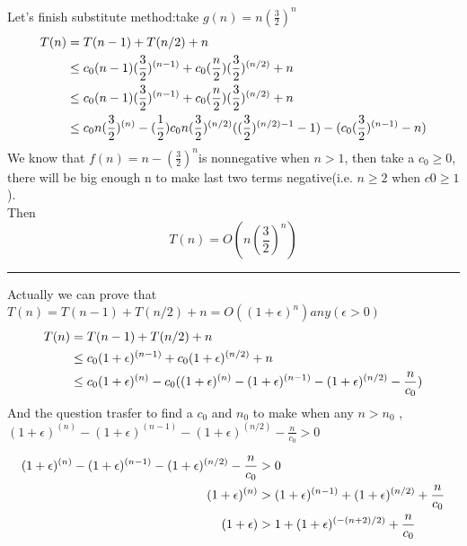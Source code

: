\documentclass[oneside]{homework} %
\begin{document}
Let's finish substitute method:take $g(n)=n {(\frac{3}{2})}^n$
\\
\begin{equation}
\notag
\begin{aligned}[b]
T(n) &= T(n-1) + T(n/2) + n \\
&\leq c_{0}(n-1)(\frac{3}{2})^{(n-1)} + c_{0}(\frac{n}{2})(\frac{3}{2})^{(n/2)} +n \\
&\leq c_{0}(n-1)(\frac{3}{2})^{(n-1)} + c_{0}(\frac{n}{2})(\frac{3}{2})^{(n/2)} +n \\
&\leq c_{0}n(\frac{3}{2})^{(n)} - (\frac{1}{2})c_{0}n(\frac{3}{2})^{(n/2)}((\frac{3}{2})^{(n/2)-1} -1 ) - (c_{0}(\frac{3}{2})^{(n-1)} - n )  \\
\end{aligned}
\end{equation}
We know that $ f(n) = n -(\frac{3}{2})^n $is nonnegative when $n>1$, then take a $c_{0} \geq 0$, there will be big enough n to make last two terms negative(i.e. $n \geq 2$ when $c{0} \geq 1 $).\\ Then $$T(n)=O(n (\frac{3}{2})^n)$$
\rule{3mm}{3mm}

\noindent Actually we can prove that $T(n) = T(n-1) + T(n/2) + n = O((1+\epsilon)^n) any (\epsilon > 0)$  
\begin{equation}
\notag
\begin{aligned}[b]
T(n) &= T(n-1) + T(n/2) + n \\
&\leq c_{0}(1+\epsilon)^{(n-1)} + c_{0}(1+\epsilon)^{(n/2)} +n \\
&\leq c_{0}(1+\epsilon)^{(n)} - c_{0}((1+\epsilon)^{(n)}-(1+\epsilon)^{(n-1)}-(1+\epsilon)^{(n/2)} -\frac{n}{c_{0}}) \\
\end{aligned}
\end{equation}
And the question trasfer to find a $c_{0}$ and $n_{0}$ to make when any $ n > n_{0}$ ,$(1+\epsilon)^{(n)}-(1+\epsilon)^{(n-1)}-(1+\epsilon)^{(n/2)} -\frac{n}{c_{0}} > 0 $

\begin{equation}
\notag
\begin{aligned}[b]
(1+\epsilon)^{(n)}-(1+\epsilon)^{(n-1)}-(1+\epsilon)^{(n/2)} -\frac{n}{c_{0}} &> 0\\
(1+\epsilon)^{(n)} &> (1+\epsilon)^{(n-1)}+(1+\epsilon)^{(n/2)} + \frac{n}{c_{0}}\\
(1+\epsilon) &> 1 +(1+\epsilon)^{(-(n+2)/2)} + \frac{n}{c_{0}}\\
\end{aligned}
\end{equation}
\end{document}
